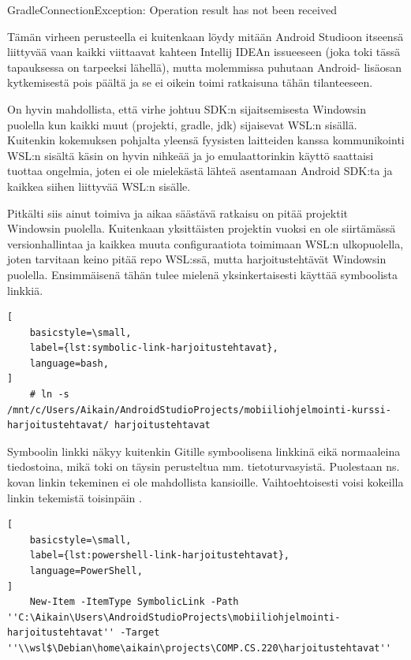 \begin{displayquote}
GradleConnectionException: Operation result has not been received
\end{displayquote}

Tämän virheen perusteella ei kuitenkaan löydy mitään Android Studioon itseensä
liittyvää vaan kaikki viittaavat kahteen Intellij IDEAn issueeseen (joka toki
tässä tapauksessa on tarpeeksi lähellä), mutta molemmissa puhutaan Android-
lisäosan kytkemisestä pois päältä ja se ei oikein toimi ratkaisuna tähän
tilanteeseen.

On hyvin mahdollista, että virhe johtuu SDK:n sijaitsemisesta Windowsin
puolella kun kaikki muut (projekti, gradle, jdk) sijaisevat WSL:n sisällä.
Kuitenkin kokemuksen pohjalta yleensä fyysisten laitteiden kanssa kommunikointi
WSL:n sisältä käsin on hyvin nihkeää ja jo emulaattorinkin käyttö saattaisi
tuottaa ongelmia, joten ei ole mielekästä lähteä asentamaan Android SDK:ta ja
kaikkea siihen liittyvää WSL:n sisälle.

Pitkälti siis ainut toimiva ja aikaa säästävä ratkaisu on pitää projektit
Windowsin puolella. Kuitenkaan yksittäisten projektin vuoksi en ole siirtämässä
versionhallintaa ja kaikkea muuta configuraatiota toimimaan WSL:n ulkopuolella,
joten tarvitaan keino pitää repo WSL:ssä, mutta harjoitustehtävät Windowsin
puolella. Ensimmäisenä tähän tulee mielenä yksinkertaisesti käyttää symboolista
linkkiä.

\begin{lstlisting}[
    basicstyle=\small,
    label={lst:symbolic-link-harjoitustehtavat},
    language=bash,
]
    # ln -s /mnt/c/Users/Aikain/AndroidStudioProjects/mobiiliohjelmointi-kurssi-harjoitustehtavat/ harjoitustehtavat
\end{lstlisting}

Symboolin linkki näkyy kuitenkin Gitille symboolisena linkkinä eikä normaaleina
tiedostoina, mikä toki on täysin perusteltua mm. tietoturvasyistä. Puolestaan
ns. kovan linkin tekeminen ei ole mahdollista kansioille. Vaihtoehtoisesti
voisi kokeilla linkin tekemistä toisinpäin
\parencite{StackoverflowWSLSymlink}.

\begin{lstlisting}[
    basicstyle=\small,
    label={lst:powershell-link-harjoitustehtavat},
    language=PowerShell,
]
    New-Item -ItemType SymbolicLink -Path ''C:\Aikain\Users\AndroidStudioProjects\mobiiliohjelmointi-harjoitustehtavat'' -Target ''\\wsl$\Debian\home\aikain\projects\COMP.CS.220\harjoitustehtavat''
\end{lstlisting}


